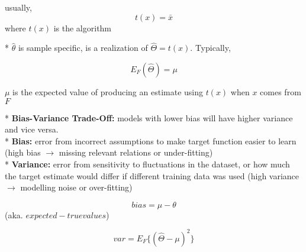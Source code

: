 \documentclass[10pt,landscape]{article}
\begin{document}
\begin{multicols}{3}
\begin{multicols}{2}
\pagebreak 
usually,
$$ t(x) = \bar{x} $$
where $t(x)$ is the algorithm
\end{multicols}
* $\hat{\theta}$ is sample specific, is a realization of $\hat{\Theta} = t(x)$. Typically,
\begin{multicols}{2}
$$ E_F(\hat{\Theta}) = \mu $$

\pagebreak 
$\mu$ is the expected value of producing an estimate using $t(x)$ when $x$ comes from $F$
\end{multicols}
* \textbf{Bias-Variance Trade-Off:} models with lower bias will have higher variance and vice versa. \\
* \textbf{Bias:} error from incorrect assumptions to make target function easier to learn (high bias $\rightarrow$ missing relevant relations or under-fitting)\\
* \textbf{Variance:} error from sensitivity to fluctuations in
the dataset, or how much the target estimate would
differ if different training data was used (high variance $\rightarrow$ modelling noise or over-fitting)
\begin{multicols}{2}
$$ bias = \mu - \theta$$
(aka. $expected - true values$)

\pagebreak 
$$ var = E_F\{(\hat{\Theta} - \mu)^2\} $$
\end{multicols}


\end{multicols}
\end{document}
